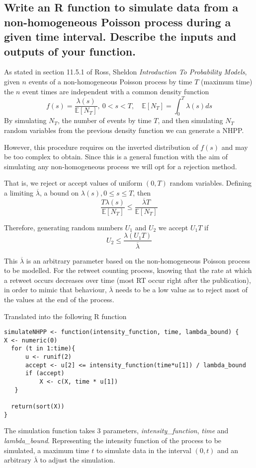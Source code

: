 \documentclass[11pt, a4paper]{article}
\begin{document}
\subsection{Write an R function to simulate data from a non-homogeneous Poisson process during a given time interval. Describe the inputs and outputs of your function.}

As stated in section 11.5.1 of Ross, Sheldon \textit{Introduction To Probability Models}, given $n$ events of a non-homogeneous Poisson process by time $T$ (maximum time) the $n$ event times are independent with a common density function
\[f(s) = \frac{\lambda(s)}{\mathbb{E}[N_T]},\ 0<s<T, \quad \mathbb{E}[N_T] = \int^T_0\lambda(s)ds\]
By simulating $N_T$, the number of events by time $T$, and then simulating $N_T$ random variables from the previous density function we can generate a NHPP.

However, this procedure requires on the inverted distribution of $f(s)$  and may be too complex to obtain. Since this is a general function with the aim of simulating any non-homogeneous process we will opt for a rejection method.

That is, we reject or accept values of uniform $(0, T)$ random variables. Defining a limiting $\overline\lambda$, a bound on $\lambda(s), 0\leq s \leq T$, then 
\[\frac{T \lambda(s)}{\mathbb{E}[N_T]} \leq \frac{\overline\lambda T}{\mathbb{E}[N_T]} \]

Therefore, generating random numbers $U_1$ and $U_2$ we accept $U_1T$ if
\[U_2 \leq \frac{\lambda(U_1T)}{\overline \lambda}\]

This $\overline\lambda$ is an arbitrary parameter based on the non-homogeneous Poisson process to be modelled. For the retweet counting process, knowing that the rate at which a retweet occurs decreases over time (most RT occur right after the publication), in order to mimic that behaviour, $\overline\lambda$ needs to be a low value as to reject most of the values at the end of the process.

Translated into the following R function
\begin{verbatim}
simulateNHPP <- function(intensity_function, time, lambda_bound) {
X <- numeric(0)
  for (t in 1:time){
      u <- runif(2)
      accept <- u[2] <= intensity_function(time*u[1]) / lambda_bound
      if (accept)
          X <- c(X, time * u[1])
   }

  return(sort(X))
}
\end{verbatim}

The simulation function takes 3 parameters, \textit{intensity\_function}, \textit{time} and \textit{lambda\_bound}. Representing the intensity function of the process to be simulated, a maximum time $t$ to simulate data in the interval $(0, t)$ and an arbitrary $\overline \lambda$ to adjust the simulation.
\end{document}
